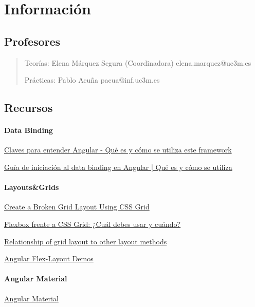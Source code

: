 \documentclass[12pt, twoside, openright]{report} %
\begin{document}

\chapter{Información}
\section{Profesores}
\begin{quote}
	Teorías: Elena Márquez Segura (Coordinadora) elena.marquez@uc3m.es

	Prácticas: Pablo Acuña pacua@inf.uc3m.es
\end{quote}

\section{Recursos}

\subsubsection{Data Binding}
\href{https://www.acontracorrientech.com/claves-para-entender-angular-que-es-y-como-se-utiliza/}{Claves para entender Angular - Qué es y cómo se utiliza este framework}

\href{https://www.acontracorrientech.com/guia-practica-del-databinding-en-angular/}{Guía de iniciación al data binding en Angular | Qué es y cómo se utiliza}

\subsubsection{Layouts\&Grids}
\href{https://webdesign.tutsplus.com/tutorials/create-a-broken-grid-layout-using-css-grid--cms-30870}{Create a Broken Grid Layout Using CSS Grid}

\href{https://webdesign.tutsplus.com/es/articles/flexbox-vs-css-grid-which-should-you-use--cms-30184}{Flexbox frente a CSS Grid: ¿Cuál debes usar y cuándo?}

\href{https://developer.mozilla.org/en-US/docs/Web/CSS/CSS_Grid_Layout/Relationship_of_Grid_Layout#grid_and_flexbox}{Relationship of grid layout to other layout methods}

\href{https://tburleson-layouts-demos.firebaseapp.com/#/docs}{Angular Flex-Layout Demos}

\subsubsection{Angular Material}
\href{https://material.angular.io/}{Angular Material}
\end{document}
